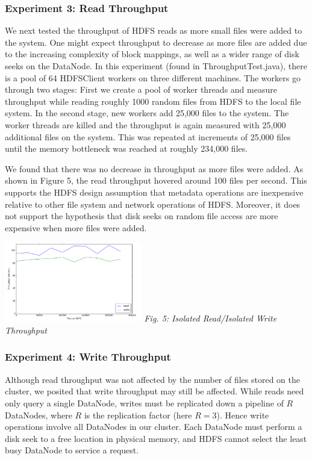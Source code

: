 \documentclass[11pt, a4paper]{article}
\begin{document}
\begin{multicols*}{2}
\subsubsection{Experiment 3: Read Throughput}\label{ReadThroughput}
We next tested the throughput of HDFS reads as more small files were added to the system. One might expect throughput to decrease as more files are added due to the increasing complexity of block mappings, as well as a wider range of disk seeks on the DataNode. In this experiment (found in ThroughputTest.java), there is a pool of 64 HDFSClient workers on three different machines. The workers go through two stages: First we create a pool of worker threads and measure throughput while reading roughly 1000 random files from HDFS to the local file system. In the second stage, new workers add 25,000 files to the system. The worker threads are killed and the throughput is again measured with 25,000 additional files on the system. This was repeated at increments of 25,000 files until the memory bottleneck was reached at roughly 234,000 files.

We found that there was no decrease in throughput as more files were added. As shown in Figure 5, the read throughput hovered around 100 files per second. This supports the HDFS design assumption that metadata operations are inexpensive relative to other file system and network operations of HDFS. Moreover, it does not support the hypothesis that disk seeks on random file access are more expensive when more files were added.

\begin{center}
	\includegraphics[keepaspectratio=true, width=0.45\textwidth]{ThroughputResults}
	\textit{Fig. 5: Isolated Read/Isolated Write Throughput}
\end{center}
\subsubsection{Experiment 4: Write Throughput}\label{WriteThroughput}
Although read throughput was not affected by the number of files stored on the cluster, we posited that write throughput may still be affected. While reads need only query a single DataNode, writes must be replicated down a pipeline of $R$ DataNodes, where $R$ is the replication factor (here $R = 3$). Hence write operations involve  all DataNodes in our cluster. Each DataNode must perform a disk seek to a free location in physical memory, and HDFS cannot select the least busy DataNode to service a request.


\end{multicols*}
\end{document}

